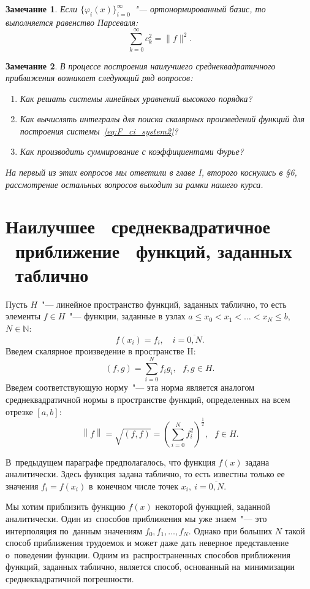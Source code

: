 \documentclass[11pt,a4paper,twoside,listtotoc,bibtotoc]{report}
\numberwithin{equation}{section}
\theoremstyle{definition}
\theoremstyle{plain}
\newtheorem{note}{Замечание}[section]
\begin{document}
%
%
\begin{note}
%
    Если $\{\varphi_i(x)\}_{i=0}^\infty$~"--- ортонормированный базис, то выполняется
    равенство Парсеваля:
    $$
        \sum_{k=0}^\infty c_k^2 = \|f\|^2.
    $$
\end{note}
%
%
\begin{note}
%
В процессе построения наилучшего среднеквадратичного приближения возникает
следующий ряд вопросов:
\begin{enumerate}
    \item Как решать системы линейных уравнений высокого порядка?
    \item Как вычислять интегралы для поиска скалярных произведений функций
        для построения системы~\eqref{eq:F_ci_system2}?
    \item Как производить суммирование с коэффициентами Фурье?
\end{enumerate}
На первый из этих вопросов мы ответили в главе I, второго коснулись в \S6,
рассмотрение остальных вопросов выходит за рамки нашего курса.
%
\end{note}
%


\section{Наилучшее ~среднеквадратичное ~приближение ~функций, заданных ~таблично}
%

Пусть $H$~"--- линейное пространство функций, заданных таблично, то есть
элементы $f \in H$~"--- функции, заданные в узлах
$a \leqslant x_0<x_1<\ldots<x_N \leqslant b$, $N\in\mathbb{N}$:
%
$$
    f(x_i) = f_i, \quad i = \overline{0,N}.
$$
%
Введем скалярное произведение в пространстве H:
%
$$
    (f,g) = \sum\limits_{i=0}^N f_i g_i,~~~f,g \in H.
$$
%
Введем соответствующую норму~"--- эта норма является аналогом среднеквадратичной
нормы в пространстве функций, определенных на всем отрезке $[a,b]$:
%
$$
    \left\|f\right\| = \sqrt{(f,f)} = \left(\sum_{i=0}^N
    f_i^2\right)^\frac{1}{2},~~~f \in H.
$$
%

В~предыдущем параграфе предполагалось, что функция $f(x)$ задана аналитически.
Здесь функция задана таблично, то есть известны только ее значения $f_i=f(x_i)$
в~конечном числе точек $x_i,~i=\overline{0,N}$.

Мы хотим приблизить функцию $f(x)$ некоторой функцией, заданной аналитически.
Один из~способов приближения мы уже знаем~"--- это интерполяция по~данным
значениям $f_0,f_1,\ldots,f_N$. Однако при больших $N$ такой способ приближения
трудоемок и может даже дать неверное представление о~поведении функции.
Одним из~распространенных способов приближения функций, заданных таблично,
является способ, основанный на~минимизации среднеквадратичной погрешности.
\end{document}
